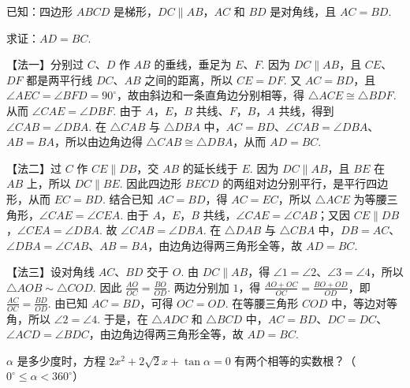 \begin{solution}
已知：四边形 \(ABCD\) 是梯形，\( DC \parallel AB \)，\(AC\) 和 \(BD\) 是对角线，且 \( AC=BD \).

求证：\( AD=BC \).

【法一】分别过 \(C\)、\(D\) 作 \(AB\) 的垂线，垂足为 \(E\)、\(F\). 因为 \(DC\parallel AB\)，且 \(CE\)、\(DF\) 都是两平行线 \(DC\)、\(AB\) 之间的距离，所以 \(CE=DF\). 又 \(AC=BD\)，且 \(\angle AEC=\angle BFD=90^\circ\)，故由斜边和一条直角边分别相等，得 \(\triangle ACE\cong\triangle BDF\). 从而 \(\angle CAE=\angle DBF\). 由于 \(A\)，\(E\)，\(B\) 共线、\(F\)，\(B\)，\(A\) 共线，得到 \(\angle CAB=\angle DBA\). 在 \(\triangle CAB\) 与 \(\triangle DBA\) 中，\(AC=BD\)、\(\angle CAB=\angle DBA\)、\(AB=BA\)，所以由边角边得 \(\triangle CAB\cong\triangle DBA\)，从而 \(AD=BC\).


【法二】过 \(C\) 作 \(CE\parallel DB\)，交 \(AB\) 的延长线于 \(E\). 因为 \(DC\parallel AB\)，且 \(BE\) 在 \(AB\) 上，所以 \(DC\parallel BE\). 因此四边形 \(BECD\) 的两组对边分别平行，是平行四边形，从而 \(EC=BD\). 结合已知 \(AC=BD\)，得 \(AC=EC\)，所以 \(\triangle ACE\) 为等腰三角形，\(\angle CAE=\angle CEA\). 由于 \(A\)，\(E\)，\(B\) 共线，\(\angle CAE=\angle CAB\)；又因 \(CE\parallel DB\)，\(\angle CEA=\angle DBA\). 故 \(\angle CAB=\angle DBA\). 在 \(\triangle DAB\) 与 \(\triangle CBA\) 中，\(DB=AC\)、\(\angle DBA=\angle CAB\)、\(AB=BA\)，由边角边得两三角形全等，故 \(AD=BC\).


【法三】设对角线 \(AC\)、\(BD\) 交于 \(O\). 由 \(DC\parallel AB\)，得 \(\angle 1=\angle 2\)、\(\angle 3=\angle 4\)，所以 \(\triangle AOB\sim\triangle COD\). 因此
\(\frac{AO}{OC}=\frac{BO}{OD}\). 两边分别加 \(1\)，得
\(\frac{AO+OC}{OC}=\frac{BO+OD}{OD}\)，即 \(\frac{AC}{OC}=\frac{BD}{OD}\). 由已知 \(AC=BD\)，可得 \(OC=OD\). 在等腰三角形 \(COD\) 中，等边对等角，所以 \(\angle 2=\angle 4\). 于是，在 \(\triangle ADC\) 和 \(\triangle BCD\) 中，\(AC=BD\)、\(DC=DC\)、\(\angle ACD=\angle BDC\)，由边角边得两三角形全等，故 \(AD=BC\).

\end{solution}

\begin{problem}
\( \alpha \) 是多少度时，方程 \( 2x^2+2\sqrt{2}x+\tan \alpha=0 \) 有两个相等的实数根？（\( 0^\circ\leqslant \alpha<360^\circ \)）
\end{problem}

